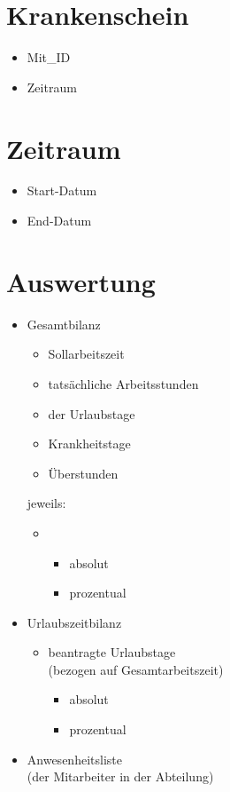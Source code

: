 \section{Krankenschein}
\begin{itemize}
\item Mit\_ID
\item Zeitraum
\end{itemize}
\section{Zeitraum}
\begin{itemize}
\item Start-Datum
\item End-Datum
\end{itemize}
\section{Auswertung}
\begin{itemize}
\item Gesamtbilanz
\begin{itemize}
\item Sollarbeitszeit
\item tatsächliche Arbeitsstunden
\item der Urlaubstage
\item Krankheitstage
\item Überstunden
\end{itemize}
jeweils: 
\begin{itemize}
\item[]
\begin{itemize}
\item absolut
\item prozentual
\end{itemize}
\end{itemize}
\item Urlaubszeitbilanz
\begin{itemize}
\item beantragte Urlaubstage\\
(bezogen auf Gesamtarbeitszeit)
\begin{itemize}
\item absolut
\item prozentual
\end{itemize}
\end{itemize}
\item Anwesenheitsliste\\
(der Mitarbeiter in der Abteilung)
\end{itemize}

 
